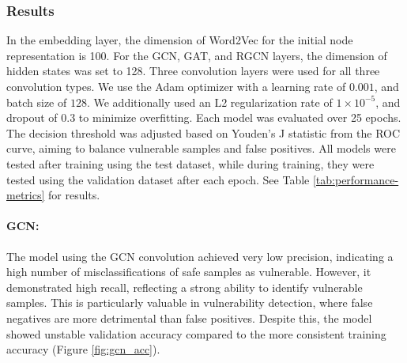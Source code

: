 \documentclass{article}
\begin{document}
\begin{table}[h]
 \centering
 \caption{Datasets used for training, testing, and validation for Complete and PrimeVul datasets}
 \label{tab:train-test-valid-split}
\end{table}



\subsubsection{Results}
In the embedding layer, the dimension of Word2Vec for the initial node representation is 100. For the GCN, GAT, and RGCN layers, the dimension of hidden states was set to 128. Three convolution layers were used for all three convolution types. We use the Adam optimizer with a learning rate of $0.001$, and batch size of $128$. We additionally used an L2 regularization rate of $1 \times 10^{-5}$, and dropout of $0.3$ to minimize overfitting. Each model was evaluated over 25 epochs. The decision threshold was adjusted based on Youden's J statistic from the ROC curve, aiming to balance vulnerable samples and false positives. All models were tested after training using the test dataset, while during training, they were tested using the validation dataset after each epoch. See Table \ref{tab:performance-metrics} for results. 
\paragraph{GCN:} The model using the GCN convolution achieved very low precision, indicating a high number of misclassifications of safe samples as vulnerable. However, it demonstrated high recall, reflecting a strong ability to identify vulnerable samples. This is particularly valuable in vulnerability detection, where false negatives are more detrimental than false positives. Despite this, the model showed unstable validation accuracy compared to the more consistent training accuracy (Figure \ref{fig:gcn_acc}).
\end{document}
